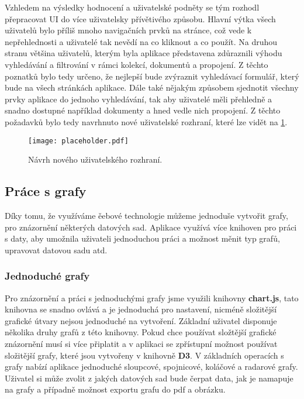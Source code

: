 \par Vzhledem na výsledky hodnocení a uživatelské podněty se tým rozhodl přepracovat UI do více uživatelsky přívětivého způsobu. Hlavní výtka všech uživatelů bylo příliš mnoho navigačních prvků na stránce, což vede k nepřehlednosti a uživatelé tak nevědí na co kliknout a co použít. Na druhou stranu většina uživatelů, kterým byla aplikace představena zdůraznili výhodu vyhledávání a filtrování v rámci kolekcí, dokumentů a propojení. Z těchto poznatků bylo tedy určeno, že nejlepší bude zvýraznit vyhledávací formulář, který bude na všech stránkách aplikace. Dále také nějakým způsobem sjednotit všechny prvky aplikace do jednoho vyhledávání, tak aby uživatelé měli přehledně a snadno dostupné například dokumenty a hned vedle nich propojení. Z těchto požadavků bylo tedy navrhnuto nové uživatelské rozhraní, které lze vidět na \ref{new-ui}.

\begin{figure}[htp]
  \centering
  \texttt{[image: placeholder.pdf]}
  \caption{Návrh nového uživatelského rozhraní.}
  \label{new-ui}
\end{figure}

\subsection{Práce s grafy}
\par Díky tomu, že využíváme ěebové technologie můžeme jednoduše vytvořit grafy, pro znázornění některých datových sad. Aplikace využívá více knihoven pro práci s daty, aby umožnila uživateli jednoduchou práci a možnost měnit typ grafů, upravovat datovou sadu atd.

\subsubsection{Jednoduché grafy}
\par Pro znázornění a práci s jednoduchými grafy jsme využili knihovny \textbf{chart.js}, tato knihovna se snadno ovlává a je jednoduchá pro nastavení, nicméně složitější grafické útvary nejsou jednoduché na vytvoření. Základní uživatel disponuje několika druhy grafů z této knihovny. Pokud chce používat složtější grafické znázornění musí si více připlatit a v aplikaci se zpřístupní možnost používat složitější grafy, které jsou vytvořeny v knihovně \textbf{D3}. V základních operacích s grafy nabízí aplikace jednoduché sloupcové, spojnicové, koláčové a radarové grafy. Uživatel si může zvolit z jakých datových sad bude čerpat data, jak je namapuje na grafy a případně možnost exportu grafu do pdf a obrázku.

